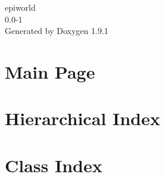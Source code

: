 \let\mypdfximage\pdfximage\def\pdfximage{\immediate\mypdfximage}\documentclass[twoside]{book}
\newcommand{\+}{\discretionary{\mbox{\scriptsize$\hookleftarrow$}}{}{}}
\newcommand{\clearemptydoublepage}{%
  \newpage{\pagestyle{empty}\cleardoublepage}%
}
\begin{document}
\raggedbottom

\hypersetup{pageanchor=false,
             bookmarksnumbered=true,
             pdfencoding=unicode
            }
\begin{titlepage}
\vspace*{7cm}
\begin{center}%
{\Large epiworld \\[1ex]\large 0.\+0-\/1 }\\
\vspace*{1cm}
{\large Generated by Doxygen 1.9.1}\\
\end{center}
\end{titlepage}
\clearemptydoublepage
{}
\tableofcontents
\clearemptydoublepage
{}
\hypersetup{pageanchor=true}

\chapter{Main Page}
\label{index}\hypertarget{index}{}
\chapter{Hierarchical Index}

\chapter{Class Index}

\end{document}
